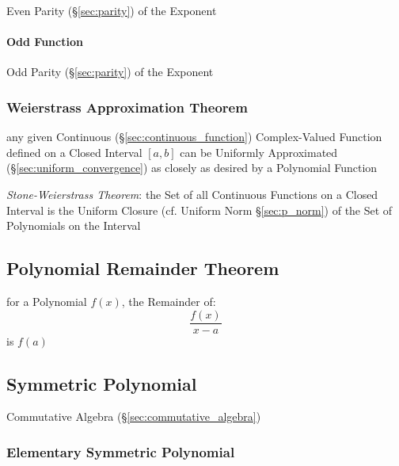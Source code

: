 Even Parity (\S\ref{sec:parity}) of the Exponent



\paragraph{Odd Function}\label{sec:odd_function}\hfill

Odd Parity (\S\ref{sec:parity}) of the Exponent



\subsubsection{Weierstrass Approximation Theorem}
\label{sec:weierstrass_approximation}

any given Continuous (\S\ref{sec:continuous_function}) Complex-Valued Function
defined on a Closed Interval $[a,b]$ can be Uniformly Approximated
(\S\ref{sec:uniform_convergence}) as closely as desired by a Polynomial Function

\emph{Stone-Weierstrass Theorem}: the Set of all Continuous Functions on a
Closed Interval is the Uniform Closure (cf. Uniform Norm \S\ref{sec:p_norm}) of
the Set of Polynomials on the Interval



\subsection{Polynomial Remainder Theorem}\label{sec:polynomial_remainder}

for a Polynomial $f(x)$, the Remainder of:
\[
  \frac{f(x)}{x - a}
\]
is $f(a)$



\subsection{Symmetric Polynomial}\label{sec:symmetric_polynomial}

\fist Commutative Algebra (\S\ref{sec:commutative_algebra})



\subsubsection{Elementary Symmetric Polynomial}\label{sec:elementary_symmetric}

